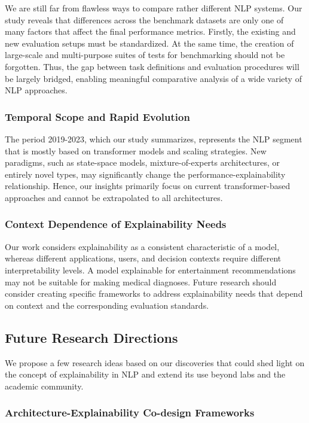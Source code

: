 \documentclass[preprint,12pt]{elsarticle}
\begin{document}
We are still far from flawless ways to compare rather different NLP systems. Our study reveals that differences across the benchmark datasets are only one of many factors that affect the final performance metrics. Firstly, the existing and new evaluation setups must be standardized. At the same time, the creation of large-scale and multi-purpose suites of tests for benchmarking should not be forgotten. Thus, the gap between task definitions and evaluation procedures will be largely bridged, enabling meaningful comparative analysis of a wide variety of NLP approaches.

\subsubsection{Temporal Scope and Rapid Evolution}

The period 2019-2023, which our study summarizes, represents the NLP segment that is mostly based on transformer models and scaling strategies. New paradigms, such as state-space models, mixture-of-experts architectures, or entirely novel types, may significantly change the performance-explainability relationship. Hence, our insights primarily focus on current transformer-based approaches and cannot be extrapolated to all architectures.

\subsubsection{Context Dependence of Explainability Needs}

Our work considers explainability as a consistent characteristic of a model, whereas different applications, users, and decision contexts require different interpretability levels. A model explainable for entertainment recommendations may not be suitable for making medical diagnoses. Future research should consider creating specific frameworks to address explainability needs that depend on context and the corresponding evaluation standards.

\subsection{Future Research Directions}

We propose a few research ideas based on our discoveries that could shed light on the concept of explainability in NLP and extend its use beyond labs and the academic community.

\subsubsection{Architecture-Explainability Co-design Frameworks}
\end{document}
